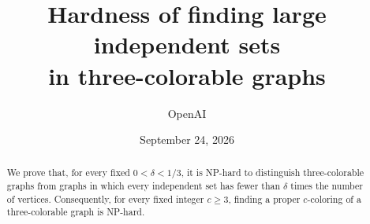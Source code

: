 \documentclass[11pt]{article}
\title{Hardness of finding large independent sets\\in three-colorable graphs}
\author{OpenAI}
\date{September 24, 2026}
\theoremstyle{definition}
\theoremstyle{remark}
\begin{document}
\maketitle
\begin{abstract}
We prove that, for every fixed $0<\delta<1/3$, it is NP-hard to distinguish
three-colorable graphs from graphs in which every independent set has fewer
than $\delta$ times the number of vertices. Consequently, for every fixed
integer $c\ge3$, finding a proper $c$-coloring of a three-colorable graph is
NP-hard.
\end{abstract}










\end{document}
